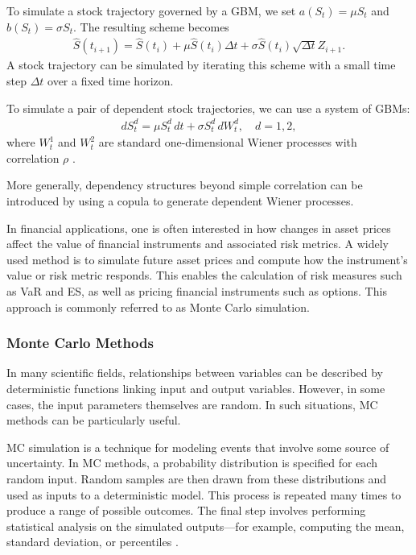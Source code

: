 To simulate a stock trajectory governed by a \gls{GBM}, we set $a(S_t) = \mu S_t$ and $b(S_t) = \sigma S_t$. The resulting scheme becomes
\begin{align*}
    \hat{S}(t_{i+1}) = \hat{S}(t_i) + \mu \hat{S}(t_i) \Delta t + \sigma \hat{S}(t_i) \sqrt{\Delta t} Z_{i+1}.
\end{align*}
A stock trajectory can be simulated by iterating this scheme with a small time step $\Delta t$ over a fixed time horizon.

To simulate a pair of dependent stock trajectories, we can use a system of \gls{GBM}s:
\begin{align*}
    dS_t^d = \mu S_t^d \,dt + \sigma S_t^d \,dW_t^d, \quad d = 1, 2,
\end{align*}
where $W_t^1$ and $W_t^2$ are standard one-dimensional Wiener processes with correlation $\rho$ \citep[p.~104]{glasserman2004monte}.

More generally, dependency structures beyond simple correlation can be introduced by using a copula to generate dependent Wiener processes.

In financial applications, one is often interested in how changes in asset prices affect the value of financial instruments and associated risk metrics. A widely used method is to simulate future asset prices and compute how the instrument's value or risk metric responds. This enables the calculation of risk measures such as \gls{VaR} and \gls{ES}, as well as pricing financial instruments such as options. This approach is commonly referred to as Monte Carlo simulation.

\subsubsection{Monte Carlo Methods} \label{sec:MonteCarlo}
In many scientific fields, relationships between variables can be described by deterministic functions linking input and output variables. However, in some cases, the input parameters themselves are random. In such situations, \gls{MC} methods can be particularly useful.

\gls{MC} simulation is a technique for modeling events that involve some source of uncertainty. In \gls{MC} methods, a probability distribution is specified for each random input. Random samples are then drawn from these distributions and used as inputs to a deterministic model. This process is repeated many times to produce a range of possible outcomes. The final step involves performing statistical analysis on the simulated outputs—for example, computing the mean, standard deviation, or percentiles \citep[pp.~91--92]{Raychaudhuri2008}.

